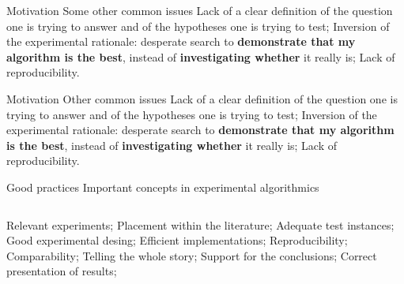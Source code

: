 \documentclass[t]{beamer}
\begin{document}

\begin{ftst}
{Motivation}
{Some other common issues}
Lack of a clear definition of the question one is trying to answer and of the hypotheses one is trying to test;
\vone
Inversion of the experimental rationale: desperate search to \textbf{demonstrate that my algorithm is the best}, instead of \textbf{investigating whether} it really is;
\vone
Lack of reproducibility.
%
\end{ftst}


\begin{ftst}
{Motivation}
{Other common issues}
Lack of a clear definition of the question one is trying to answer and of the hypotheses one is trying to test;
\vone
Inversion of the experimental rationale: desperate search to \textbf{demonstrate that my algorithm is the best}, instead of \textbf{investigating whether} it really is;
\vone
Lack of reproducibility.
%
\end{ftst}


\begin{ftst}
{Good practices}
{Important concepts in experimental algorithmics}
\begin{columns}
\bitems Relevant experiments;
\spitem Placement within the literature;
\spitem Adequate test instances;
\spitem Good experimental desing;
\spitem Efficient implementations;
\eitem
{}
\bitems Reproducibility;
\spitem Comparability;
\spitem Telling the whole story;
\spitem Support for the conclusions;
\spitem Correct presentation of results;
\eitem
\end{columns}
%
\end{ftst}
\end{document}
